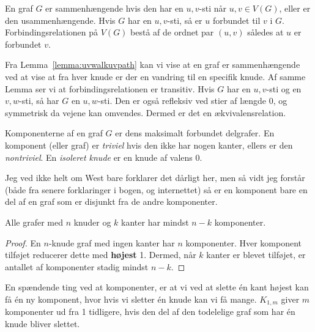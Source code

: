 \begin{definition}
	En graf $G$ er sammenhængende hvis den har en $u,v$-sti når $u,v \in V(G)$, eller er den usammenhængende. Hvis $G$ har en $u,v$-sti, så er $u$ forbundet til $v$ i $G$. Forbindingsrelationen på $V(G)$ bestå af de ordnet par $(u,v)$ således at $u$ er forbundet $v$.
\end{definition}

\begin{remark}
	Fra Lemma~\ref{lemma:uvwalkuvpath} kan vi vise at en graf er sammenhængende ved at vise at fra hver knude er der en vandring til en specifik knude. Af samme Lemma ser vi at forbindingsrelationen er transitiv. Hvis $G$ har en $u,v$-sti og en $v,w$-sti, så har $G$ en $u,w$-sti. Den er også refleksiv ved stier af længde 0, og symmetrisk da vejene kan omvendes. Dermed er det en ækvivalensrelation.
\end{remark}

\begin{definition}
	Komponenterne af en graf $G$ er dens maksimalt forbundet delgrafer. En komponent (eller graf) er \textit{triviel} hvis den ikke har nogen kanter, ellers er den \textit{nontriviel}. En \textit{isoleret knude} er en knude af valens 0.
\end{definition}

Jeg ved ikke helt om West bare forklarer det dårligt her, men så vidt jeg forstår (både fra senere forklaringer i bogen, og internettet) så er en komponent bare en del af en graf som er disjunkt fra de andre komponenter.

\begin{proposition}
	Alle grafer med $n$ knuder og $k$ kanter har mindst $n-k$ komponenter.
\end{proposition}
\begin{proof}
	En $n$-knude graf med ingen kanter har $n$ komponenter. Hver komponent tilføjet reducerer dette med \textbf{højest} 1. Dermed, når $k$ kanter er blevet tilføjet, er antallet af komponenter stadig mindst $n-k$.
\end{proof}

En spændende ting ved at komponenter, er at vi ved at slette én kant højest kan få én ny komponent, hvor hvis vi sletter én knude kan vi få mange. $K_{1,m}$ giver $m$ komponenter ud fra 1 tidligere, hvis den del af den todelelige graf som har én knude bliver slettet.



